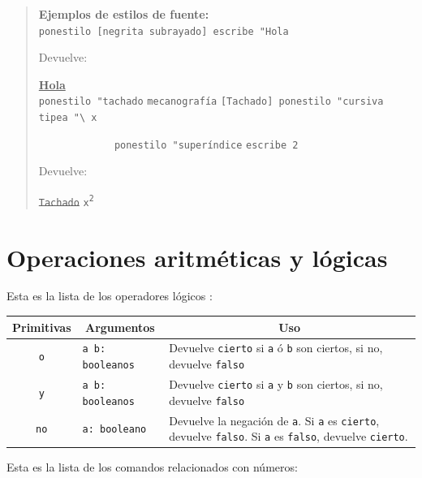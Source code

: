 \begin{quote}
   \noindent \textbf{Ejemplos de estilos de fuente:} \\

   \verb+ponestilo [negrita subrayado] escribe "Hola+

   \noindent Devuelve: 

   \underline{\textbf{Hola}} \\

   \verb+ponestilo "tachado+ \texttt{mecanograf\'ia}
      \verb+[Tachado] ponestilo "cursiva tipea "\ x+

   \verb+             ponestilo "+\texttt{super\'indice} \verb+escribe 2+

    Devuelve:

    \sout{\texttt{Tachado}} \texttt{x\textsuperscript{2}}
\end{quote}

\section{Operaciones aritm\'eticas y l\'ogicas}
   \label{Aritmetico-Logicas}

Esta es la lista de los operadores l\'ogicos :
\begin{center} \begin{longtable}{|c|l|m{9cm}|} \hline 
   \multicolumn{1}{|c|}{\textbf{Primitivas}}&
      \multicolumn{1}{c|}{\textbf{Argumentos}}&
         \multicolumn{1}{c|}{\textbf{Uso}} \\ \endhead \hline 
   \texttt{o} \index{o@\texttt{o}} & \texttt{a b: booleanos} &
        Devuelve \texttt{cierto} si \texttt{a} \'o \texttt{b} son ciertos, si
        no, devuelve \texttt{falso} \\ \hline 
   \texttt{y} \index{y@\texttt{y}} & \texttt{a b: booleanos} &
        Devuelve \texttt{cierto} si \texttt{a} y \texttt{b} son ciertos, si
        no, devuelve \texttt{falso} \\ \hline 
 \texttt{no} \index{no@\texttt{no}} & \texttt{a: booleano \index{Booleano}} &
        Devuelve la negaci\'on de \texttt{a}. Si \texttt{a} es \texttt{cierto},
        devuelve \texttt{falso}. Si \texttt{a} es \texttt{falso}, devuelve
        \texttt{cierto}. \\ \hline
\end{longtable} \end{center}

Esta es la lista de los comandos relacionados con n\'umeros:

